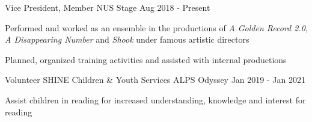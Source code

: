 

\begin{cventries}

  \cventry
    {Vice President, Member} %
    {NUS Stage} %
    {} %
    {Aug 2018 - Present} %
    {
      \begin{cvitems} %
        \item {Performed and worked as an ensemble in the productions of \textcolor{eduDft-darkblue}{\textit{A Golden Record 2.0}, \textit{A Disappearing Number} and \textit{Shook}} under famous artistic directors}
        \item {Planned, organized training activities and assisted with internal productions}
      \end{cvitems}
    }

  \cventry
    {Volunteer} %
    {SHINE Children \& Youth Services ALPS Odyssey} %
    {} %
    {Jan 2019 - Jan 2021} %
    {
      \begin{cvitems} %
        \item {Assist children in reading for increased understanding, knowledge and interest for reading}
      \end{cvitems}
    }

\end{cventries}
